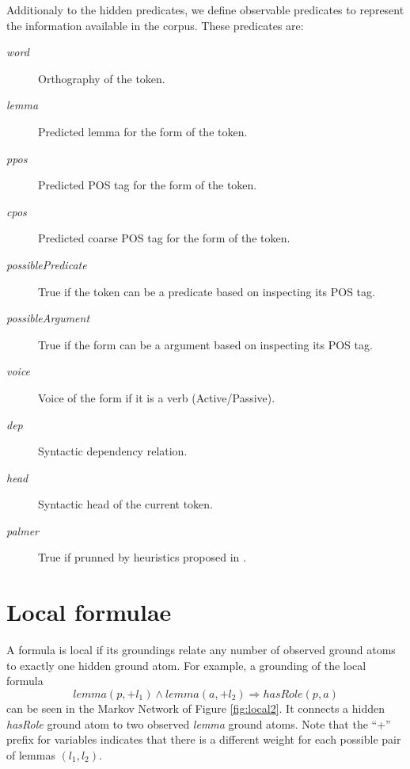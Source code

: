 Additionaly to the hidden predicates, we define observable predicates to
represent the information available in the corpus. These predicates are:
\begin{description}
    \item[\emph{word}] Orthography of the token.
    \item[\emph{lemma}] Predicted lemma for the form of the token.
    \item[\emph{ppos}] Predicted POS tag for the form of the token.
    \item[\emph{cpos}] Predicted coarse POS tag for the form of the token.
    \item[\emph{possiblePredicate}] True if the token can be a predicate based on inspecting its POS tag.
    \item[\emph{possibleArgument}] True if the form can be a argument based on inspecting its POS tag.
    \item[\emph{voice}] Voice of the form if it is a verb (Active/Passive).
    \item[\emph{dep}] Syntactic dependency relation.
    \item[\emph{head}] Syntactic head of the current token.
    \item[\emph{palmer}] True if prunned by heuristics proposed in
        \citet{.}.
\end{description}

\section{Local formulae}
\label{sec:local}

A formula is local if its groundings relate any number of observed ground atoms to exactly one hidden ground atom. For example, a grounding of the local formula 
\[lemma(p,+l_1) \wedge lemma(a,+l_2) \Rightarrow hasRole(p,a)\]
can be seen in the Markov Network of Figure \ref{fig:local2}. It connects a hidden \emph{hasRole} ground atom to two observed \emph{lemma} ground atoms. Note that the ``+'' prefix for variables indicates that there is a different weight for each possible pair of lemmas $(l_1,l_2)$.

